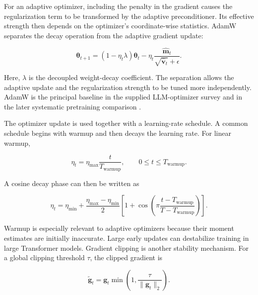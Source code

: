 For an adaptive optimizer, including the penalty in the gradient causes
the regularization term to be transformed by the adaptive preconditioner.
Its effective strength then depends on the optimizer's coordinate-wise
statistics. AdamW separates the decay operation from the adaptive
gradient update:

\begin{equation}
    \boxed{
    \boldsymbol{\theta}_{t+1}
    =
    (1-\eta_t\lambda)\boldsymbol{\theta}_t
    -
    \eta_t
    \frac{\widehat{\mathbf{m}}_t}
    {\sqrt{\widehat{\mathbf{v}}_t}+\epsilon}.
    }
    \label{eq:opt-adamw-update}
\end{equation}

Here, $\lambda$ is the decoupled weight-decay coefficient. The separation
allows the adaptive update and the regularization strength to be tuned
more independently. AdamW is the principal baseline in the supplied
LLM-optimizer survey and in the later systematic pretraining comparison
\parencite{Ranganath2026Navigating,Wen2026Fantastic}.

The optimizer update is used together with a learning-rate schedule.
A common schedule begins with warmup and then decays the learning rate.
For linear warmup,

\begin{equation}
    \eta_t
    =
    \eta_{\max}\frac{t}{T_{\mathrm{warmup}}},
    \qquad
    0\leq t\leq T_{\mathrm{warmup}}.
    \label{eq:opt-linear-warmup}
\end{equation}

A cosine decay phase can then be written as

\begin{equation}
    \eta_t
    =
    \eta_{\min}
    +
    \frac{\eta_{\max}-\eta_{\min}}{2}
    \left[
        1+
        \cos\left(
            \pi
            \frac{t-T_{\mathrm{warmup}}}
            {T-T_{\mathrm{warmup}}}
        \right)
    \right].
    \label{eq:opt-cosine-decay}
\end{equation}

Warmup is especially relevant to adaptive optimizers because their moment
estimates are initially inaccurate. Large early updates can destabilize
training in large Transformer models. Gradient clipping is another
stability mechanism. For a global clipping threshold $\tau$, the clipped
gradient is

\begin{equation}
    \widetilde{\mathbf{g}}_t
    =
    \mathbf{g}_t
    \min\left(
        1,\frac{\tau}{\|\mathbf{g}_t\|_2}
    \right).
    \label{eq:opt-gradient-clipping}
\end{equation}

